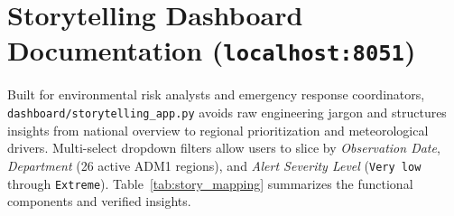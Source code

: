 \documentclass[11pt,a4paper]{article}
\begin{document}
\FloatBarrier

\section{Storytelling Dashboard Documentation (\texttt{localhost:8051})}

Built for environmental risk analysts and emergency response coordinators, \texttt{dashboard/storytelling\_app.py} avoids raw engineering jargon and structures insights from national overview to regional prioritization and meteorological drivers. Multi-select dropdown filters allow users to slice by \textit{Observation Date}, \textit{Department} (26 active ADM1 regions), and \textit{Alert Severity Level} (\texttt{Very low} through \texttt{Extreme}). Table~\ref{tab:story_mapping} summarizes the functional components and verified insights.
\end{document}
